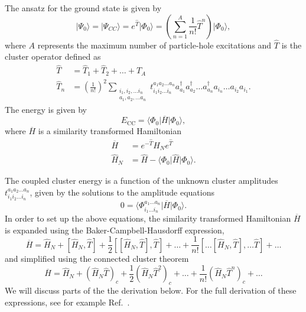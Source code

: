   The ansatz for the ground state  is given by
  \begin{equation}
     \vert \Psi_0\rangle = \vert \Psi_{CC}\rangle = e^{\hat{T}} \vert
     \Phi_0\rangle = \left( \sum_{n=1}^{A} \frac{1}{n!} \hat{T}^n
     \right) \vert \Phi_0\rangle,
  \end{equation}
  where $A$ represents the maximum number of particle-hole excitations
  and $\hat{T}$ is the cluster operator defined as
  \begin{align}
              \hat{T} &= \hat{T}_1 + \hat{T}_2 + \ldots + \hat{T}_A
              \\ \hat{T}_n &= \left(\frac{1}{n!}\right)^2
              \sum_{\substack{ i_1,i_2,\ldots i_n \\ a_1,a_2,\ldots
                  a_n}} t_{i_1i_2\ldots i_n}^{a_1a_2\ldots a_n}
              a_{a_1}^\dagger a_{a_2}^\dagger \ldots a_{a_n}^\dagger
              a_{i_n} \ldots a_{i_2} a_{i_1}.
          \end{align}
      The energy is given by
      \begin{equation}
          E_{\mathrm{CC}} = \langle\Phi_0\vert \overline{H}\vert
          \Phi_0\rangle,
      \end{equation}
      where $\overline{H}$ is a similarity transformed Hamiltonian
      \begin{align}
          \overline{H}&= e^{-\hat{T}} \hat{H}_N e^{\hat{T}}
          \\ \hat{H}_N &= \hat{H} - \langle\Phi_0\vert \hat{H} \vert
          \Phi_0\rangle.
      \end{align}

      The coupled cluster energy is a function of the unknown cluster
      amplitudes $t_{i_1i_2\ldots i_n}^{a_1a_2\ldots a_n}$, given by
      the solutions to the amplitude equations
      \begin{equation}\label{eq:amplitudeeq}
          0 = \langle\Phi_{i_1 \ldots i_n}^{a_1 \ldots a_n}\vert
          \overline{H}\vert \Phi_0\rangle.
      \end{equation}
In order to set up the above equations, 
the similarity transformed Hamiltonian $\overline{H}$ is expanded
  using the Baker-Campbell-Hausdorff expression,
      \begin{equation}\label{eq:bch}
          \overline{H}= \hat{H}_N + \left[ \hat{H}_N, \hat{T} \right]
          + \frac{1}{2} \left[\left[ \hat{H}_N, \hat{T} \right],
            \hat{T}\right] + \ldots + \frac{1}{n!} \left[
            \ldots \left[ \hat{H}_N, \hat{T} \right], \ldots \hat{T}
            \right] +\dots
      \end{equation}
  and simplified using the connected cluster theorem
      \begin{equation}
          \overline{H}= \hat{H}_N + \left( \hat{H}_N \hat{T}\right)_c
          + \frac{1}{2} \left( \hat{H}_N \hat{T}^2\right)_c + \dots +
          \frac{1}{n!} \left( \hat{H}_N \hat{T}^n\right)_c +\dots
      \end{equation}
We will discuss parts of the the derivation below.
For the full derivation of these expressions, see for example Ref.~\cite{shavittbartlett2009}. 

